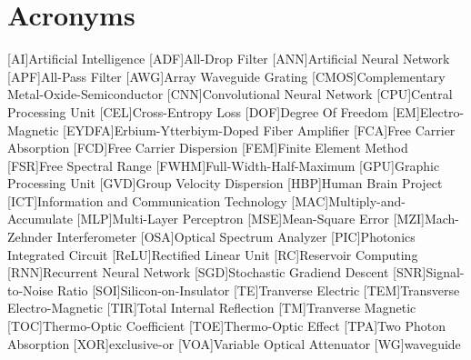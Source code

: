 \chapter*{Acronyms}
\markboth{}{}
\begin{multicols}{2}
\begin{acronym}[EYDFA]
	
	[AI]{Artificial Intelligence}
	[ADF]{All-Drop Filter}
	[ANN]{Artificial Neural Network}
	[APF]{All-Pass Filter}
	[AWG]{Array Waveguide Grating}
	[CMOS]{Complementary Metal-Oxide-Semiconductor}
	[CNN]{Convolutional Neural Network}
	[CPU]{Central Processing Unit}
	[CEL]{Cross-Entropy Loss}
	[DOF]{Degree Of Freedom}
	[EM]{Electro-Magnetic}
	[EYDFA]{Erbium-Ytterbiym-Doped Fiber Amplifier}
	[FCA]{Free Carrier Absorption}
	[FCD]{Free Carrier Dispersion}
	[FEM]{Finite Element Method}
	[FSR]{Free Spectral Range}
	[FWHM]{Full-Width-Half-Maximum}
	[GPU]{Graphic Processing Unit}
	[GVD]{Group Velocity Dispersion}
	[HBP]{Human Brain Project}
	[ICT]{Information and Communication Technology}
	[MAC]{Multiply-and-Accumulate}
	[MLP]{Multi-Layer Perceptron}
	[MSE]{Mean-Square Error}
	[MZI]{Mach-Zehnder Interferometer}
	[OSA]{Optical Spectrum Analyzer}
	[PIC]{Photonics Integrated Circuit}
	[ReLU]{Rectified Linear Unit}
	[RC]{Reservoir Computing}
	[RNN]{Recurrent Neural Network}
	[SGD]{Stochastic Gradiend Descent}
	[SNR]{Signal-to-Noise Ratio}
	[SOI]{Silicon-on-Insulator}
	[TE]{Tranverse Electric}
	[TEM]{Transverse Electro-Magnetic}
	[TIR]{Total Internal Reflection}
	[TM]{Tranverse Magnetic}
	[TOC]{Thermo-Optic Coefficient}
	[TOE]{Thermo-Optic Effect}
	[TPA]{Two Photon Absorption}
	[XOR]{exclusive-or}
	[VOA]{Variable Optical Attenuator}
	[WG]{waveguide}
\end{acronym}
\end{multicols}